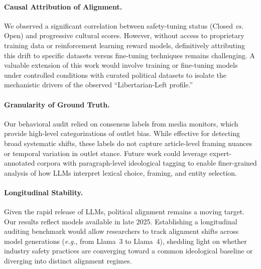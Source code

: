 \documentclass[11pt]{article}
\begin{document}
\paragraph{Causal Attribution of Alignment.}
We observed a significant correlation between safety-tuning status (Closed \textit{vs.} Open) and progressive cultural scores. However, without access to proprietary training data or reinforcement learning reward models, definitively attributing this drift to specific datasets versus fine-tuning techniques remains challenging. A valuable extension of this work would involve training or fine-tuning models under controlled conditions with curated political datasets to isolate the mechanistic drivers of the observed ``Libertarian-Left profile.''

\paragraph{Granularity of Ground Truth.}
Our behavioral audit relied on consensus labels from media monitors, which provide high-level categorizations of outlet bias. While effective for detecting broad systematic shifts, these labels do not capture article-level framing nuances or temporal variation in outlet stance. Future work could leverage expert-annotated corpora with paragraph-level ideological tagging to enable finer-grained analysis of how LLMs interpret lexical choice, framing, and entity selection.

\paragraph{Longitudinal Stability.}
Given the rapid release of LLMs, political alignment remains a moving target. Our results reflect models available in late 2025. Establishing a longitudinal auditing benchmark would allow researchers to track alignment shifts across model generations (\textit{e.g.}, from Llama~3 to Llama~4), shedding light on whether industry safety practices are converging toward a common ideological baseline or diverging into distinct alignment regimes.

%



% 




\appendix
\end{document}
